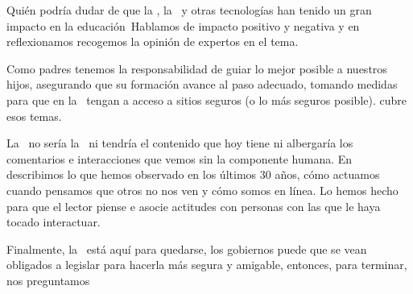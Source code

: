 \oqm Qui\'en podr\'ia dudar de que la \web, la \internet\ y otras tecnolog\'ias han
tenido un gran impacto en la educaci\'on\cqm\ Hablamos de impacto positivo
y negativa y en  reflexionamos recogemos la
opini\'on de expertos en el tema.

Como padres tenemos la responsabilidad de guiar lo mejor posible a nuestros
hijos, asegurando que su formaci\'on avance al paso adecuado,
tomando medidas para que en la \web\ tengan a acceso a sitios seguros (o lo
m\'as seguros posible).  cubre esos
temas.

La \web\ no ser\'ia la \web\ ni tendr\'ia el contenido que hoy tiene ni
albergar\'ia los comentarios e interacciones que vemos sin la componente
humana. En  describimos lo que hemos observado
en los \'ultimos 30 a\~nos, c\'omo actuamos cuando pensamos que otros no
nos ven y c\'omo somos en l\'inea. Lo hemos hecho para que el lector piense
e asocie actitudes con personas con las que le haya tocado interactuar.

Finalmente, la \web\ est\'a aqu\'i para quedarse, los gobiernos puede que
se vean obligados a legislar para hacerla m\'as segura y amigable,
entonces, para terminar, nos preguntamos 



